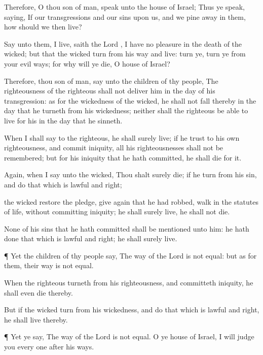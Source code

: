 {\par }{\PP {}Therefore, O thou
son of
man,
speak unto the
house of
Israel; Thus ye
speak,
saying, If our
transgressions and our
sins
{} upon us, and we pine
away in them, how should we then
live?

Say unto them,
{} I
live,
saith the
Lord
{}, I have no
pleasure in the
death of the
wicked; but that the
wicked
turn from his
way and
live:
turn ye,
turn ye from your
evil
ways; for why will ye
die, O
house of
Israel?

Therefore, thou
son of
man,
say unto the
children of thy
people, The
righteousness of the
righteous shall not
deliver him in the
day of his
transgression: as for the
wickedness of the
wicked, he shall not
fall thereby in the
day that he
turneth from his
wickedness; neither shall the
righteous be
able to
live for his
{} in the
day that he
sinneth.

When I shall
say to the
righteous,
{} he shall
surely
live; if he
trust to his own
righteousness, and
commit
iniquity, all his
righteousnesses shall not be
remembered; but for his
iniquity that he hath
committed, he shall
die for it.

Again, when I
say unto the
wicked, Thou shalt
surely
die; if he
turn from his
sin, and
do that which is
lawful and
right;

 the
wicked
restore the
pledge, give
again that he had
robbed,
walk in the
statutes of
life, without
committing
iniquity; he shall
surely
live, he shall not
die.

None of his
sins that he hath
committed shall be
mentioned unto him: he hath
done that which is
lawful and
right; he shall
surely
live.


\par }{\PP {}¶ Yet the
children of thy
people
say, The
way of the
Lord is not
equal: but as for them, their
way is not
equal.

When the
righteous
turneth from his
righteousness, and
committeth
iniquity, he shall even
die thereby.

But if the
wicked
turn from his
wickedness, and
do that which is
lawful and
right, he shall
live thereby.


\par }{\PP {}¶ Yet ye
say, The
way of the
Lord is not
equal. O ye
house of
Israel, I will
judge you every
one after his
ways.


}
